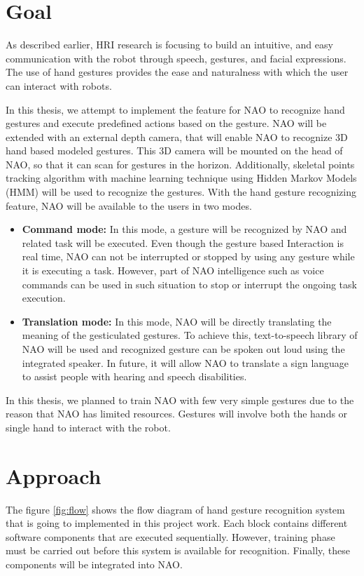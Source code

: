 \chapter{Goal} As described earlier, HRI research is focusing to build an intuitive, and easy communication with the robot through speech, gestures, and facial expressions. The use of hand gestures provides the ease and naturalness with which the user can interact with robots.

In this thesis, we attempt to implement the feature for NAO to recognize hand gestures and execute predefined actions based on the gesture. NAO will be extended with an external depth camera, that will enable NAO to recognize 3D hand based modeled gestures. This 3D camera will be mounted on the head of NAO, so that it can scan for gestures in the horizon. Additionally, skeletal points tracking algorithm with machine learning technique using Hidden Markov Models (HMM) will be used to recognize the gestures. With the hand gesture recognizing feature, NAO will be available to the users in two modes.

\begin{itemize}
	\item \textbf{Command mode:} In this mode, a gesture will be recognized by NAO and related task will be executed. Even though the gesture based Interaction is real time, NAO can not be interrupted or stopped by using any gesture while it is executing a task. However, part of NAO intelligence such as voice commands can be used in such situation to stop or interrupt the ongoing task execution.
	\item \textbf{Translation mode:} In this mode, NAO will be directly translating the meaning of the gesticulated gestures. To achieve this, text-to-speech library of NAO will be used and recognized gesture can be spoken out loud using the integrated speaker. In future, it will allow NAO to translate a sign language to assist people with hearing and speech disabilities.
\end{itemize}

In this thesis, we planned to train NAO with few very simple gestures due to the reason that NAO has limited resources. Gestures will involve both the hands or single hand to interact with the robot.

\chapter{Approach} The figure \ref{fig:flow} shows the flow diagram of hand gesture recognition system that is going to implemented in this project work. Each block contains different software components that are executed sequentially. However, training phase must be carried out before this system is available for recognition. Finally, these components will be integrated into NAO.

